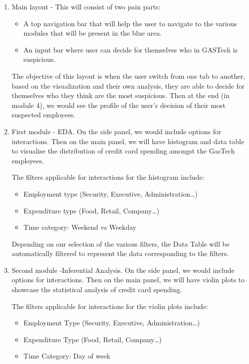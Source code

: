 \documentclass[
]{article}
\providecommand{\tightlist}{%
  \setlength{\itemsep}{0pt}\setlength{\parskip}{0pt}}
\begin{document}
\begin{enumerate}
\def\labelenumi{\arabic{enumi}.}
\item
  Main layout - This will consist of two pain parts:

  \begin{itemize}
  \tightlist
  \item
    A top navigation bar that will help the user to navigate to the various modules that will be present in the blue area.
  \item
    An input bar where user can decide for themselves who in GASTech is suspicious.
  \end{itemize}

  The objective of this layout is when the user switch from one tab to another, based on the visualization and their own analysis, they are able to decide for themselves who they think are the most suspicious. Then at the end (in module 4), we would see the profile of the user's decision of their most suspected employees.
\item
  First module - EDA. On the side panel, we would include options for interactions. Then on the main panel, we will have histogram and data table to visualise the distribution of credit card spending amongst the GasTech employees.

  The filters applicable for interactions for the histogram include:

  \begin{itemize}
  \tightlist
  \item
    Employment type (Security, Executive, Administration\ldots{})
  \item
    Expenditure type (Food, Retail, Company\ldots{})
  \item
    Time category: Weekend vs Weekday
  \end{itemize}

  Depending on our selection of the various filters, the Data Table will be automatically filtered to represent the data corresponding to the filters.
\item
  Second module -Inferential Analysis. On the side panel, we would include options for interactions. Then on the main panel, we will have violin plots to showcase the statistical analysis of credit card spending.

  The filters applicable for interactions for the violin plots include:

  \begin{itemize}
  \tightlist
  \item
    Employment Type (Security, Executive, Administration\ldots{})
  \item
    Expenditure Type (Food, Retail, Company\ldots{})
  \item
    Time Category: Day of week
  \end{itemize}


\end{enumerate}
\end{document}
